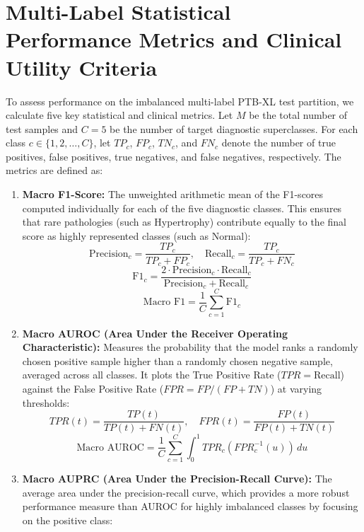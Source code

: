 \documentclass[12pt,a4paper]{report}
\begin{document}
\section{Multi-Label Statistical Performance Metrics and Clinical Utility Criteria}
To assess performance on the imbalanced multi-label PTB-XL test partition, we calculate five key statistical and clinical metrics. Let $M$ be the total number of test samples and $C=5$ be the number of target diagnostic superclasses. For each class $c \in \{1, 2, \dots, C\}$, let $TP_c$, $FP_c$, $TN_c$, and $FN_c$ denote the number of true positives, false positives, true negatives, and false negatives, respectively. The metrics are defined as:
\begin{enumerate}
    \item \textbf{Macro F1-Score:} The unweighted arithmetic mean of the F1-scores computed individually for each of the five diagnostic classes. This ensures that rare pathologies (such as Hypertrophy) contribute equally to the final score as highly represented classes (such as Normal):
    \begin{equation}
        \text{Precision}_{c} = \frac{TP_{c}}{TP_{c} + FP_{c}}, \quad \text{Recall}_{c} = \frac{TP_{c}}{TP_{c} + FN_{c}}
    \end{equation}
    \begin{equation}
        \text{F1}_{c} = \frac{2 \cdot \text{Precision}_{c} \cdot \text{Recall}_{c}}{\text{Precision}_{c} + \text{Recall}_{c}}
    \end{equation}
    \begin{equation}
        \text{Macro F1} = \frac{1}{C} \sum_{c=1}^{C} \text{F1}_{c}
    \end{equation}
    \item \textbf{Macro AUROC (Area Under the Receiver Operating Characteristic):} Measures the probability that the model ranks a randomly chosen positive sample higher than a randomly chosen negative sample, averaged across all classes. It plots the True Positive Rate ($TPR = \text{Recall}$) against the False Positive Rate ($FPR = FP / (FP + TN)$) at varying thresholds:
    \begin{equation}
        TPR(t) = \frac{TP(t)}{TP(t) + FN(t)}, \quad FPR(t) = \frac{FP(t)}{FP(t) + TN(t)}
    \end{equation}
    \begin{equation}
        \text{Macro AUROC} = \frac{1}{C} \sum_{c=1}^{C} \int_{0}^{1} TPR_c(FPR_c^{-1}(u)) \, du
    \end{equation}
    \item \textbf{Macro AUPRC (Area Under the Precision-Recall Curve):} The average area under the precision-recall curve, which provides a more robust performance measure than AUROC for highly imbalanced classes by focusing on the positive class:

\end{enumerate}
\end{document}
